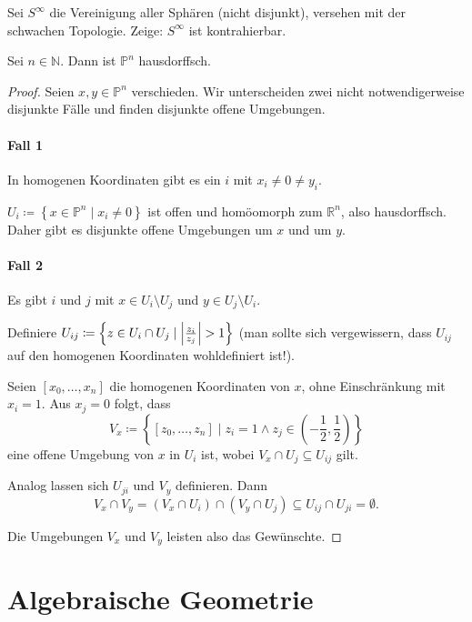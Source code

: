 \documentclass[ngerman, 11pt, a4paper, twoside, abstracton]{scrbook}
\begin{document}
\begin{exercise}
  Sei $S^\infty$ die Vereinigung aller Sphären (nicht disjunkt), versehen mit der schwachen Topologie. Zeige: $S^\infty$ ist kontrahierbar.
\end{exercise}

\begin{exercise}
  Sei $n\in\mathbb{N}$. Dann ist $\mathbb{P}^n$ hausdorffsch.
\end{exercise}
\begin{proof}
  Seien $x, y \in \mathbb{P}^n$ verschieden. Wir unterscheiden zwei nicht notwendigerweise disjunkte Fälle und finden disjunkte offene Umgebungen.

  \paragraph{Fall 1} In homogenen Koordinaten gibt es ein $i$ mit $x_i \ne 0 \ne y_i$.
  
  $U_i \coloneqq \left\{ x \in \mathbb{P}^n \mid x_i \ne 0 \right\}$ ist offen und homöomorph zum $\mathbb{R}^n$, also hausdorffsch. Daher gibt es disjunkte offene Umgebungen um $x$ und um $y$.
  \paragraph{Fall 2} Es gibt $i$ und $j$ mit $x\in U_i \setminus U_j$ und $y\in U_j \setminus U_i$.

  Definiere $U_{ij} \coloneqq \left\{ z\in U_i \cap U_j \mid \abs{\frac{z_i}{z_j}} > 1\right\}$ (man sollte sich vergewissern, dass $U_{ij}$ auf den homogenen Koordinaten wohldefiniert ist!).

  Seien $\left[ x_0, \ldots, x_n \right]$ die homogenen Koordinaten von $x$, ohne Einschränkung mit $x_i = 1$. Aus $x_j = 0$ folgt, dass
  \[
    V_x \coloneqq \left\{ \left[ z_0, \ldots, z_n \right] \mid z_i = 1 \land z_j \in \left( -\frac{1}{2}, \frac{1}{2} \right) \right\}
  \]
  eine offene Umgebung von $x$ in $U_i$ ist, wobei $V_x \cap U_j \subseteq U_{ij}$ gilt.

  Analog lassen sich $U_{ji}$ und $V_y$ definieren. Dann
  \[
    V_x \cap V_y = \left( V_x \cap U_i \right) \cap \left( V_y \cap U_j \right) \subseteq U_{ij} \cap U_{ji} = \emptyset.
  \]

  Die Umgebungen $V_x$ und $V_y$ leisten also das Gewünschte.
\end{proof}
\section{Algebraische Geometrie}
\end{document}
